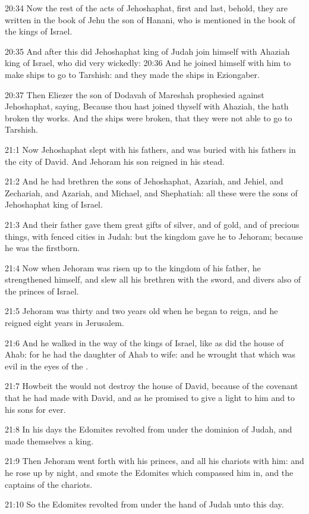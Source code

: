 20:34 Now the rest of the acts of Jehoshaphat, first and last, behold, they are written in the book of Jehu the son of Hanani, who is mentioned in the book of the kings of Israel.

20:35 And after this did Jehoshaphat king of Judah join himself with Ahaziah king of Israel, who did very wickedly: 20:36 And he joined himself with him to make ships to go to Tarshish: and they made the ships in Eziongaber.

20:37 Then Eliezer the son of Dodavah of Mareshah prophesied against Jehoshaphat, saying, Because thou hast joined thyself with Ahaziah, the \LORD hath broken thy works. And the ships were broken, that they were not able to go to Tarshish.

21:1 Now Jehoshaphat slept with his fathers, and was buried with his fathers in the city of David. And Jehoram his son reigned in his stead.

21:2 And he had brethren the sons of Jehoshaphat, Azariah, and Jehiel, and Zechariah, and Azariah, and Michael, and Shephatiah: all these were the sons of Jehoshaphat king of Israel.

21:3 And their father gave them great gifts of silver, and of gold, and of precious things, with fenced cities in Judah: but the kingdom gave he to Jehoram; because he was the firstborn.

21:4 Now when Jehoram was risen up to the kingdom of his father, he strengthened himself, and slew all his brethren with the sword, and divers also of the princes of Israel.

21:5 Jehoram was thirty and two years old when he began to reign, and he reigned eight years in Jerusalem.

21:6 And he walked in the way of the kings of Israel, like as did the house of Ahab: for he had the daughter of Ahab to wife: and he wrought that which was evil in the eyes of the \LORD.

21:7 Howbeit the \LORD would not destroy the house of David, because of the covenant that he had made with David, and as he promised to give a light to him and to his sons for ever.

21:8 In his days the Edomites revolted from under the dominion of Judah, and made themselves a king.

21:9 Then Jehoram went forth with his princes, and all his chariots with him: and he rose up by night, and smote the Edomites which compassed him in, and the captains of the chariots.

21:10 So the Edomites revolted from under the hand of Judah unto this day.

